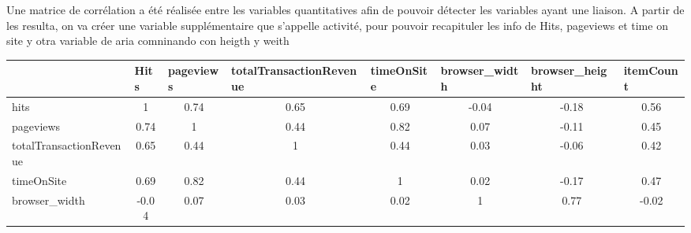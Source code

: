 Une matrice de corrélation a été réalisée entre les variables quantitatives afin de pouvoir détecter les variables ayant une liaison. A partir de les resulta, on va créer une variable supplémentaire que s'appelle activité, pour pouvoir recapituler les info de Hits, pageviews et time on site y otra variable de aria comninando con heigth y weith

\begin{table}[ht]
\begin{adjustbox}{width=1\textwidth}
\small
\begin{tabular}{|l|c|c|c|c|c|c|c|}
\hline
                        & \multicolumn{1}{l|}{Hits} & \multicolumn{1}{l|}{pageviews} & \multicolumn{1}{l|}{totalTransactionRevenue} & \multicolumn{1}{l|}{timeOnSite} & \multicolumn{1}{l|}{browser\_width} & \multicolumn{1}{l|}{browser\_height} & \multicolumn{1}{l|}{itemCount} \\ \hline
hits                    & 1                         & \cellcolor{green!15} 0.74                           & 0.65                                         & 0.69                            & -0.04                               & -0.18                                & 0.56                           \\ \hline
pageviews               & \cellcolor{green!15}0.74                      & 1                              & 0.44                                         & \cellcolor{green!15}0.82                            & 0.07                                & -0.11                                & 0.45                           \\ \hline
totalTransactionRevenue & 0.65                      & 0.44                           & 1                                            & 0.44                            & 0.03                                & -0.06                                & 0.42                           \\ \hline
timeOnSite              & 0.69                      &\cellcolor{green!15} 0.82                           & 0.44                                         & 1                               & 0.02                                & -0.17                                & 0.47                           \\ \hline
browser\_width          & -0.04                     & 0.07                           & 0.03                                         & 0.02                            & 1                                   & \cellcolor{green!15}0.77                                 & -0.02                          \\ \hline

\end{tabular}
\end{adjustbox}
\end{table}
